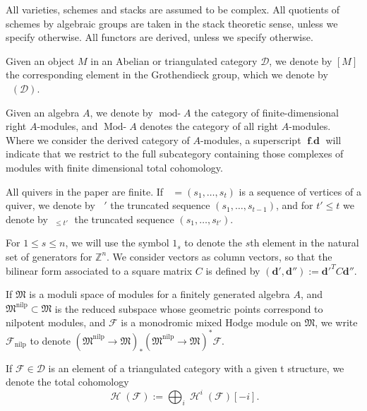 \documentclass[a4paper,10pt]{amsart}
\newcommand{\dd}{\mathbf{d}}
\newcommand{\Mst}{\mathfrak{M}}
\DeclareMathOperator{\nilp}{nilp}
\DeclareMathOperator{\KK}{K_0}
\DeclareMathOperator{\fd}{\mathbf{f.d}}
\DeclareMathOperator{\tmod}{mod-}
\DeclareMathOperator{\Tmod}{Mod-}
\newcommand{\rmod}[1]{\tmod\!#1}
\newcommand{\Rmod}[1]{\Tmod\!#1}
\DeclareMathOperator{\Ss}{\overline{s}}
\DeclareMathOperator{\Ho}{\mathcal{H}}
\newcommand{\Du}{\mathcal{D}^{\geq}}
\newcommand{\Dl}{\mathcal{D}^{\leq}}
\begin{document}
All varieties, schemes and stacks are assumed to be complex.  All quotients of schemes by algebraic groups are taken in the stack theoretic sense, unless we specify otherwise.  All functors are derived, unless we specify otherwise.

Given an object $M$ in an Abelian or triangulated category $\mathcal{D}$, we denote by $[M]$ the corresponding element in the Grothendieck group, which we denote by $\KK(\mathcal{D})$.

Given an algebra $A$, we denote by $\rmod{A}$ the category of finite-dimensional right $A$-modules, and $\Rmod{A}$ denotes the category of all right $A$-modules.  Where we consider the derived category of $A$-modules, a superscript $\fd$ will indicate that we restrict to the full subcategory containing those complexes of modules with finite dimensional total cohomology.  

All quivers in the paper are finite.  If $\Ss=(s_1,\ldots,s_t)$ is a sequence of vertices of a quiver, we denote by $\Ss'$ the truncated sequence $(s_1,\ldots,s_{t-1})$, and for $t'\leq t$ we denote by $\Ss_{\leq t'}$ the truncated sequence $(s_1,\ldots,s_{t'})$.

For $1\leq s\leq n$, we will use the symbol $1_s$ to denote the $s$th element in the natural set of generators for $\mathbb{Z}^n$.  We consider vectors as column vectors, so that the bilinear form associated to a square matrix $C$ is defined by $(\dd',\dd''):=\dd'^TC\dd''$.

If $\Mst$ is a moduli space of modules for a finitely generated algebra $A$, and $\Mst^{\nilp}\subset \Mst$ is the reduced subspace whose geometric points correspond to nilpotent modules, and $\mathcal{F}$ is a monodromic mixed Hodge module on $\Mst$, we write $\mathcal{F}_{\nilp}$ to denote $(\Mst^{\nilp}\rightarrow \Mst)_*(\Mst^{\nilp}\rightarrow \Mst)^*\mathcal{F}$. 

If $\mathcal{F}\in\mathcal{D}$ is an element of a triangulated category with a given t structure, we denote the total cohomology
\[
\Ho(\mathcal{F}):=\bigoplus_{i}\Ho^i(\mathcal{F})[-i].
\]
\end{document}
